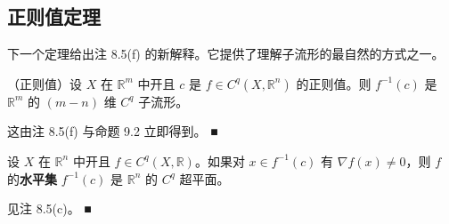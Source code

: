 \subsection*{正则值定理}

下一个定理给出注 8.5(f) 的新解释。它提供了理解子流形的最自然的方式之一。

\begin{theorem}

（正则值）设 $ X $ 在 $ \mathbb{R}^{m} $ 中开且 $ c $ 是 $ f \in C^{q}(X, \mathbb{R}^{n}) $ 的正则值。则 $ f^{-1}(c) $ 是 $ \mathbb{R}^{m} $ 的 $ (m - n) $ 维 $ C^{q} $ 子流形。

\proofhead
这由注 8.5(f) 与命题 9.2 立即得到。 \nobreak\hspace{0.35em}■
\end{theorem}

\begin{corollary}

设 $ X $ 在 $ \mathbb{R}^{n} $ 中开且 $ f \in C^{q}(X, \mathbb{R}) $。如果对 $ x \in f^{-1}(c) $ 有 $ \nabla f(x) \ne 0 $，则 $ f $ 的\textbf{水平集} $ f^{-1}(c) $ 是 $ \mathbb{R}^{n} $ 的 $ C^{q} $ 超平面。

\proofhead
见注 8.5(c)。 \nobreak\hspace{0.35em}■
\end{corollary}

